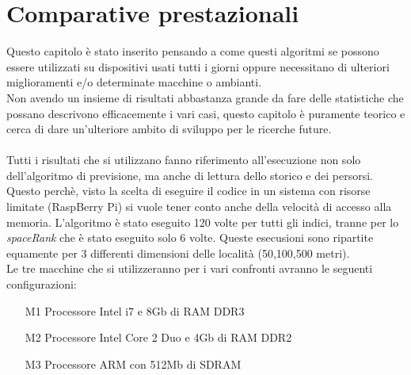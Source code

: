 \chapter{Comparative prestazionali}
Questo capitolo \`e stato inserito pensando a come questi algoritmi se possono
essere utilizzati su dispositivi usati tutti i giorni oppure necessitano di
ulteriori miglioramenti e/o determinate macchine o ambianti.\\
Non avendo un insieme di risultati abbastanza grande da fare delle statistiche
che possano descrivono efficacemente i vari casi, questo capitolo \`e puramente
teorico e cerca di dare un'ulteriore ambito di sviluppo per le ricerche future.\\
\\
Tutti i risultati che si utilizzano fanno riferimento all'esecuzione non solo
dell'algoritmo di previsione, ma anche di lettura dello storico e dei persorsi.
Questo perch\`e, visto la scelta di eseguire il codice in un sistema con risorse
limitate (RaspBerry Pi) si vuole tener conto anche della velocità di accesso alla memoria.
L'algoritmo \`e stato eseguito 120 volte per tutti gli indici, tranne per lo
\textit{spaceRank} che \`e stato eseguito solo 6 volte. Queste esecusioni sono ripartite
equamente per 3 differenti dimensioni delle localit\`a (50,100,500 metri).
\\
Le tre macchine che si utilizzeranno per i vari confronti avranno le seguenti configurazioni:
\begin{itemize}
\item [M1] Processore Intel i7 \cite{new_3} e 8Gb di RAM DDR3
\item [M2] Processore Intel Core 2 Duo \cite{new_4} e 4Gb di RAM DDR2
\item [M3] Processore ARM \cite{new_5} con 512Mb di SDRAM
\end{itemize}

